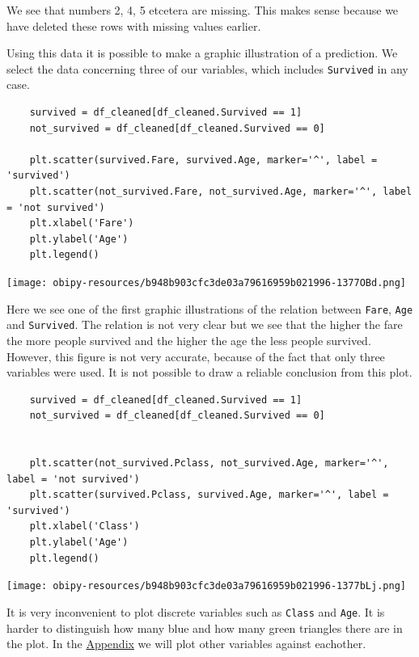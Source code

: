 \documentclass[11pt]{article}
\begin{document}
We see that numbers 2, 4, 5 etcetera are missing. This makes sense because we have deleted these rows with missing values earlier. 

Using this data it is possible to make a graphic illustration of a prediction. We select the data concerning three of our variables, which includes \texttt{Survived} in any case. 


\begin{verbatim}
    survived = df_cleaned[df_cleaned.Survived == 1]
    not_survived = df_cleaned[df_cleaned.Survived == 0]

    plt.scatter(survived.Fare, survived.Age, marker='^', label = 'survived')
    plt.scatter(not_survived.Fare, not_survived.Age, marker='^', label = 'not survived')
    plt.xlabel('Fare')
    plt.ylabel('Age')
    plt.legend()
\end{verbatim}

\begin{center}
\texttt{[image: obipy-resources/b948b903cfc3de03a79616959b021996-1377OBd.png]}
\end{center}

Here we see one of the first graphic illustrations of the relation between \texttt{Fare}, \texttt{Age}
and \texttt{Survived}. The relation is not very clear but we see that the higher the fare the more people survived and the higher the age the less people survived. However, this figure is not very accurate, because of the fact that only three variables were used. It is not possible to draw a reliable conclusion from this plot.



\begin{verbatim}
    survived = df_cleaned[df_cleaned.Survived == 1]
    not_survived = df_cleaned[df_cleaned.Survived == 0]


    plt.scatter(not_survived.Pclass, not_survived.Age, marker='^', label = 'not survived')
    plt.scatter(survived.Pclass, survived.Age, marker='^', label = 'survived')
    plt.xlabel('Class')
    plt.ylabel('Age')
    plt.legend()
\end{verbatim}

\begin{center}
\texttt{[image: obipy-resources/b948b903cfc3de03a79616959b021996-1377bLj.png]}
\end{center}


It is very inconvenient to plot discrete variables such as \texttt{Class} and \texttt{Age}. It is harder to distinguish how many blue and how many green triangles there are in the plot. In the \hyperref[sec:appendix]{Appendix} we will plot other variables against eachother. 
\newpage
\end{document}
